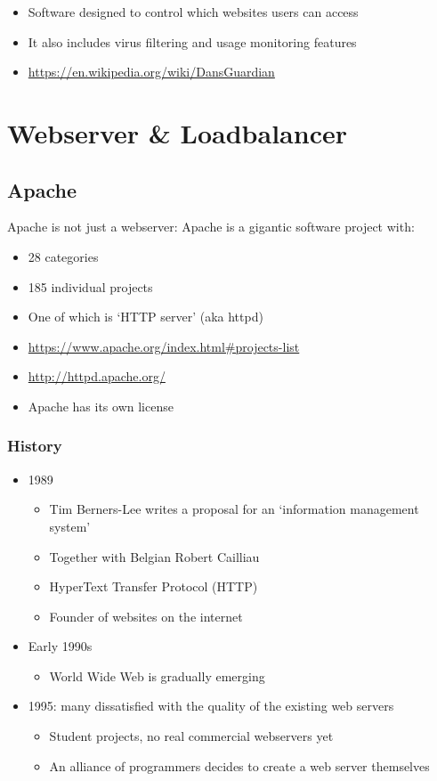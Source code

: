 \documentclass{article}
\begin{document}
\begin{itemize}
    \item Software designed to control which websites users can access
    \item It also includes virus filtering and usage monitoring features
    \item \url{https://en.wikipedia.org/wiki/DansGuardian}
\end{itemize}

\section{Webserver \& Loadbalancer}
\subsection{Apache}

Apache is not just a webserver: Apache is a gigantic software project with:

\begin{itemize}
    \item 28 categories
    \item 185 individual projects
    \item One of which is `HTTP server' (aka httpd)
    \item \url{https://www.apache.org/index.html#projects-list}
    \item \url{http://httpd.apache.org/}
    \item Apache has its own license 
\end{itemize}

\subsubsection{History}

\begin{itemize}
    \item 1989 
    \begin{itemize}
        \item Tim Berners-Lee writes a proposal for an `information management system'
        \item Together with Belgian Robert Cailliau
        \item HyperText Transfer Protocol (HTTP)
        \item Founder of websites on the internet
    \end{itemize}
    \item Early 1990s
    \begin{itemize}
        \item World Wide Web is gradually emerging
    \end{itemize}
    \item 1995: many dissatisfied with the quality of the existing web servers
    \begin{itemize}
        \item Student projects, no real commercial webservers yet
        \item An alliance of programmers decides to create a web server themselves
    \end{itemize}
\end{itemize}
\end{document}
